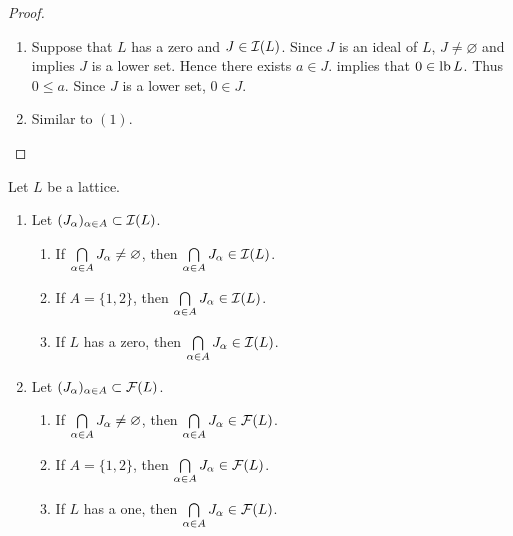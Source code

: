 \documentclass{book}
\begin{document}
	\begin{proof}\
		\begin{enumerate}
			\item Suppose that $L$ has a zero and $J \in \mathcal{I}(L)$. Since $J$ is an ideal of $L$, $J \neq \varnothing$ and  implies $J$ is a lower set. Hence there exists $a \in J$.  implies that $0 \in \operatorname{lb} L$. Thus $0 \leq a$. Since $J$ is a lower set, $0 \in J$.
			\item Similar to $(1)$.
		\end{enumerate} 
	\end{proof}
	
	\begin{ex}
		Let $L$ be a lattice. 
		\begin{enumerate}
			\item Let $(J_{\alpha})_{\alpha \in A} \subset \mathcal{I}(L)$. 
			\begin{enumerate}
				\item If $\bigcap\limits_{\alpha \in A} J_{\alpha} \neq \varnothing$, then $\bigcap\limits_{\alpha \in A} J_{\alpha} \in \mathcal{I}(L)$. 
				\item If $A = \{1,2\}$, then $\bigcap\limits_{\alpha \in A} J_{\alpha} \in \mathcal{I}(L)$.
				\item If $L$ has a zero, then $\bigcap\limits_{\alpha \in A} J_{\alpha} \in \mathcal{I}(L)$.
			\end{enumerate}
			\item Let $(J_{\alpha})_{\alpha \in A} \subset \mathcal{F}(L)$. 
			\begin{enumerate}
				\item If $\bigcap\limits_{\alpha \in A} J_{\alpha} \neq \varnothing$, then $\bigcap\limits_{\alpha \in A} J_{\alpha} \in \mathcal{F}(L)$. 
				\item If $A = \{1,2\}$, then $\bigcap\limits_{\alpha \in A} J_{\alpha} \in \mathcal{F}(L)$.
				\item If $L$ has a one, then $\bigcap\limits_{\alpha \in A} J_{\alpha} \in \mathcal{F}(L)$. 
			\end{enumerate}
		\end{enumerate}
	\end{ex}
	
\end{document}
